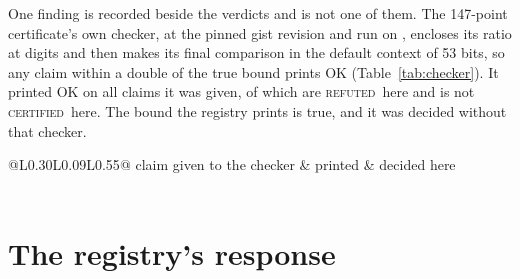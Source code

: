 \documentclass[preprint,11pt,authoryear,a4paper]{elsarticle}
\newcommand{\vword}[1]{{\normalfont\scshape #1}}
\newcommand{\vC}{\vword{certified}}
\newcommand{\vR}{\vword{refuted}}
\begin{document}
One finding is recorded beside the verdicts and is not one of them. The 147-point certificate's own checker, at the pinned gist revision and run on \OcCheckerDate, encloses its ratio at \OcCheckerDps{} digits and then makes its final comparison in the default context of 53 bits, so any claim within a double of the true bound prints OK (Table~\ref{tab:checker}). It printed OK on all \MtRgCheckerOk{} claims it was given, of which \MtRgCheckerFalse{} are \vR\ here and \MtRgCheckerUndecided{} is not \vC\ here. The bound the registry prints is true, and it was decided without that checker.

\begin{table}[htbp]\centering\footnotesize\setlength{\tabcolsep}{4pt}
\begin{tabular}{@{}L{0.30\linewidth}L{0.09\linewidth}L{0.55\linewidth}@{}}\toprule
claim given to the checker & printed & decided here \\\midrule
\OcCheckerRows \\
\bottomrule\end{tabular}
\caption{The 147-point certificate's own checker on four claims (\texttt{certs/sumdiff-ledger.json}): its own 60-digit bound; that bound raised at the fifty-eighth decimal; and two bounds raised in the seventeenth significant digit, within one double of the true bound.}\label{tab:checker}
\end{table}

\section{The registry's response}\label{sec:after}
\end{document}
